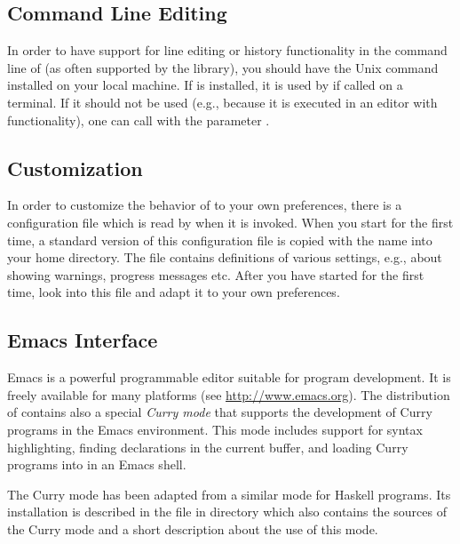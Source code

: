 \subsection{Command Line Editing}

In order to have support for line editing or history functionality
in the command line of \CYS (as often supported by the 
library), you should have the Unix command  installed
on your local machine.
If  is installed, it is used by \CYS if called on a terminal.
If it should not be used (e.g., because it is executed
in an editor with  functionality), one can
call \CYS with the parameter .


\subsection{Customization}
\label{sec-customization}

In order to customize the behavior of \CYS to your own preferences,
there is a configuration file which is read by \CYS when it is invoked.
When you start \CYS for the first time, a standard version of
this configuration file is copied with the name
into your home directory. The file contains definitions
of various settings, e.g., about showing warnings, progress messages etc.
After you have started \CYS for the first time, look into this file
and adapt it to your own preferences.


\subsection{Emacs Interface}

Emacs is a powerful programmable editor suitable for program development.
It is freely available for many platforms
(see \url{http://www.emacs.org}).
The distribution of \CYS contains also a special
\emph{Curry mode}
that supports the development of Curry programs in
the Emacs environment.
This mode includes support for syntax highlighting,
finding declarations in the current buffer, and
loading Curry programs into \CYS
in an Emacs shell.

The Curry mode has been adapted from a similar mode for Haskell programs.
Its installation is described in the file 
in directory  which also contains
the sources of the Curry mode and a short description about
the use of this mode.



